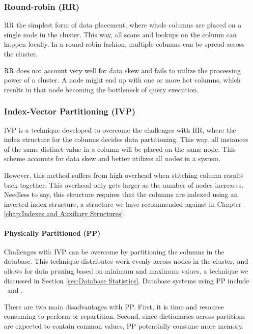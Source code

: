 \subsubsection{Round-robin (RR)}
\label{ssub:Round-robin (RR)}
RR the simplest form of data placement, where whole columns are placed on a single node in the cluster. This way, all scans and lookups on the column can happen locally. In a round-robin fashion, multiple columns can be spread across the cluster.

RR does not account very well for data skew and fails to utilize the processing power of a cluster. A node might end up with one or more hot columns, which results in that node becoming the bottleneck of query execution.

\subsubsection{Index-Vector Partitioning (IVP)}
\label{ssub:Index-Vector Partitioning (IVP)}
IVP is a technique developed to overcome the challenges with RR, where the index structure for the columns decides data partitioning. This way, all instances of the same distinct value in a column will be placed on the same node. This scheme accounts for data skew and better utilizes all nodes in a system.

However, this method suffers from high overhead when stitching column results back together. This overhead only gets larger as the number of nodes increases. Needless to say, this structure requires that the columns are indexed using an inverted index structure, a structure we have recommended against in Chapter \ref{chap:Indexes and Auxiliary Structures}.

\paragraph{Physically Partitioned (PP)}
\label{par:Physically Partitioned (PP)}
Challenges with IVP can be overcome by partitioning the columns in the database. This technique distributes work evenly across nodes in the cluster, and allows for data pruning based on minimum and maximum values, a technique we discussed in Section \ref{sec:Database Statistics}. Database systems using PP include \oracle~and \saph.

There are two main disadvantages with PP. First, it is time and resource consuming to perform or repartition. Second, since dictionaries across partitions are expected to contain common values, PP potentially consume more memory.

